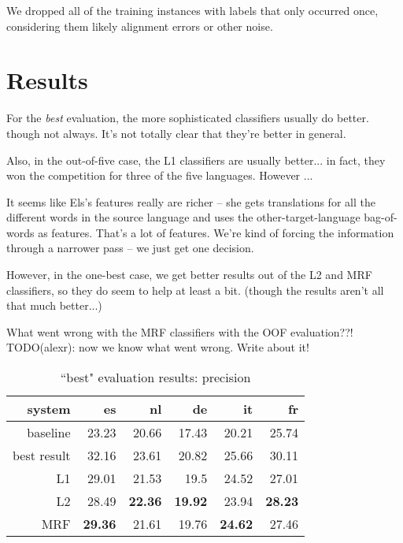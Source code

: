 \documentclass[11pt,letterpaper]{article}
\begin{document}
We dropped all of the training instances with labels that only occurred once,
considering them likely alignment errors or other noise.

\section{Results}
For the \emph{best} evaluation, the more sophisticated classifiers usually do
better. though not always. It's not totally clear that they're better in
general.

Also, in the out-of-five case, the L1 classifiers are usually better... in
fact, they won the competition for three of the five languages.
However ...

It seems like Els's features really are richer -- she gets translations for all
the different words in the source language and uses the other-target-language
bag-of-words as features. That's a lot of features. We're kind of forcing the
information through a narrower pass -- we just get one decision.

However, in the one-best case, we get better results out of the L2 and MRF
classifiers, so they do seem to help at least a bit. (though the results aren't
all that much better...)

What went wrong with the MRF classifiers with the OOF evaluation??!
TODO(alexr): now we know what went wrong. Write about it!

\begin{table*}[t!]
  \begin{center}
    \begin{tabular}{|r|r|r|r|r|r|}
      \hline
      system   & es    & nl    & de    &  it   & fr \\
      \hline
      baseline & 23.23          & 20.66          & 17.43          & 20.21          & 25.74 \\
   best result & 32.16          & 23.61          & 20.82          & 25.66          & 30.11 \\
            L1 & 29.01          & 21.53          & 19.5           & 24.52          & 27.01 \\
            L2 & 28.49          & \textbf{22.36} & \textbf{19.92} & 23.94          & \textbf{28.23} \\
           MRF & \textbf{29.36} & 21.61          & 19.76          & \textbf{24.62} & 27.46 \\
      \hline
    \end{tabular}
  \caption{``best" evaluation results: precision}
  \label{table:resultsbest}
  \end{center}
\end{table*}
\end{document}
